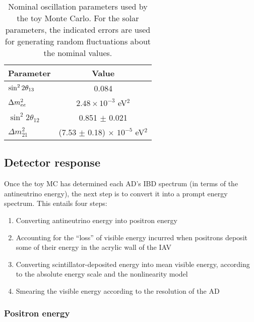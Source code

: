 \documentclass[../thesis.tex]{subfiles}
\begin{document}
\begin{table}[ht]
  \begin{tabular}{lc}
    \toprule
    Parameter & Value \\
    \midrule
    $\sin^2 2\theta_{13}$ & 0.084 \\
    $\Delta m^2_{ee}$ & $2.48 \times 10^{-3}$ eV$^2$ \\
    $\sin^2 2\theta_{12}$ & 0.851 $\pm$ 0.021\\
    $\Delta m^2_{21}$ & (7.53 $\pm$ 0.18) $\times$ $10^{-5}$ eV$^2$ \\
    \bottomrule
  \end{tabular}
  \caption{Nominal oscillation parameters used by the toy Monte Carlo. For the solar parameters, the indicated errors are used for generating random fluctuations about the nominal values.}
  \label{tab:toyNomOscPars}
\end{table}

\subsection{Detector response}
\label{sec:fitToyDetResponse}

Once the toy MC has determined each AD's IBD spectrum (in terms of the antineutrino energy), the next step is to convert it into a prompt energy spectrum. This entails four steps:

\begin{enumerate}
\item Converting antineutrino energy into positron energy
\item Accounting for the ``loss'' of visible energy incurred when positrons deposit some of their energy in the acrylic wall of the IAV
\item Converting scintillator-deposited energy into mean visible energy, according to the absolute energy scale and the nonlinearity model
\item Smearing the visible energy according to the resolution of the AD
\end{enumerate}

\subsubsection{Positron energy}
\end{document}
